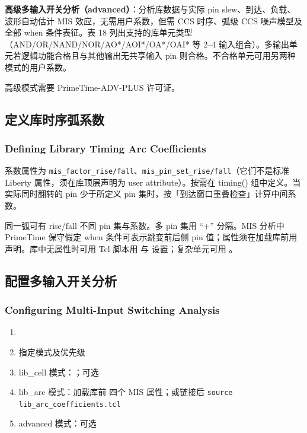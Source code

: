 \textbf{高级多输入开关分析（advanced）}：分析库数据与实际 pin slew、到达、负载、波形自动估计 MIS 效应，无需用户系数，但需 CCS 时序、弧级 CCS 噪声模型及全部 when 条件表征。表 18 列出支持的库单元类型（AND/OR/NAND/NOR/AO*/AOI*/OA*/OAI* 等 2--4 输入组合）。多输出单元若逻辑功能合格且与其他输出无共享输入 pin 则合格。不合格单元可用另两种模式的用户系数。

高级模式需要 PrimeTime-ADV-PLUS 许可证。

\subsection{定义库时序弧系数}
\subsubsection*{Defining Library Timing Arc Coefficients}

系数属性为 \texttt{mis\_factor\_rise/fall}、\texttt{mis\_pin\_set\_rise/fall}（它们不是标准 Liberty 属性，须在库顶层声明为 user attribute）。按需在 timing() 组中定义。当实际同时翻转的 pin 少于所定义 pin 集时，按「到达窗口重叠检查」计算中间系数。

同一弧可有 rise/fall 不同 pin 集与系数。多 pin 集用 ``+'' 分隔。MIS 分析中 PrimeTime 保守假定 when 条件可表示跳变前后侧 pin 值；属性须在加载库前用  声明。库中无属性时可用 Tcl 脚本用  与  设置；复杂单元可用 。

\subsection{配置多输入开关分析}
\subsubsection*{Configuring Multi-Input Switching Analysis}

\begin{enumerate}
  \item {}
  \item {} 指定模式及优先级
  \item lib\_cell 模式：；可选 
  \item lib\_arc 模式：加载库前  四个 MIS 属性；或链接后 \texttt{source lib\_arc\_coefficients.tcl}
  \item advanced 模式：可选 
\end{enumerate}

